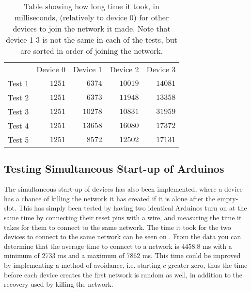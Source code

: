 \begin{table}[ht]
\centering
\begin{tabular}{lllll}
                            & Device 0                  & Device 1                   & Device 2                   & Device 3                   \\ \cline{2-5} 
\multicolumn{1}{r|}{Test 1} & \multicolumn{1}{r|}{$1251$} & \multicolumn{1}{r|}{$6374$}  & \multicolumn{1}{r|}{$10019$} & \multicolumn{1}{r|}{$14081$} \\ \cline{2-5} 
\multicolumn{1}{r|}{Test 2} & \multicolumn{1}{r|}{$1251$} & \multicolumn{1}{r|}{$6373$}  & \multicolumn{1}{r|}{$11948$} & \multicolumn{1}{r|}{$13358$} \\ \cline{2-5} 
\multicolumn{1}{r|}{Test 3} & \multicolumn{1}{r|}{$1251$} & \multicolumn{1}{r|}{$10278$} & \multicolumn{1}{r|}{$10831$} & \multicolumn{1}{r|}{$31959$} \\ \cline{2-5} 
\multicolumn{1}{r|}{Test 4} & \multicolumn{1}{r|}{$1251$} & \multicolumn{1}{r|}{$13658$} & \multicolumn{1}{r|}{$16080$} & \multicolumn{1}{r|}{$17372$} \\ \cline{2-5} 
\multicolumn{1}{r|}{Test 5} & \multicolumn{1}{r|}{$1251$} & \multicolumn{1}{r|}{$8572$}  & \multicolumn{1}{r|}{$12502$} & \multicolumn{1}{r|}{$17131$} \\ \cline{2-5} 
\end{tabular}
\caption{Table showing how long time it took, in milliseconds, (relatively to device 0) for other devices to join the network it made. Note that device 1-3 is not the same in each of the tests, but are sorted in order of joining the network.}
\label{tab:ccrc_test}
\end{table}

\subsection{Testing Simultaneous Start-up of Arduinos}
The simultaneous start-up of devices has also been implemented, where a device has a chance of killing the network it has created if it is alone after the empty-slot.
This has simply been tested by having two identical Arduinos turn on at the same time by connecting their reset pins with a wire, and measuring the time it takes for them to connect to the same network.
The time it took for the two devices to connect to the same network can be seen on .
From the data you can determine that the average time to connect to a network is 4458.8 ms with a minimum of 2733 ms and a maximum of 7862 ms.
This time could be improved by implementing a method of avoidance, i.e. starting $c$ greater zero, thus the time before each device creates the first network is random as well, in addition to the recovery used by killing the network.

